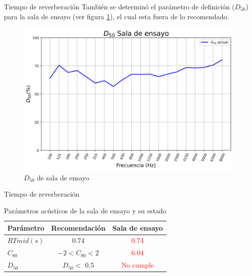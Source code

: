 \documentclass{sintefbeamer}
\begin{document}
\begin{frame}{Tiempo de reverberación}
    También se determinó el parámetro de definición ($D_{50}$) para la sala de ensayo (ver figura \ref{fig: D50 sala de ensayo}), el cual esta fuera de lo recomendado.
    \begin{figure}[H]
        \centering
        \includegraphics[scale=0.35]{images/D50_ensayo.png}
        \caption{$D_{50}$ de sala de ensayo}
        \label{fig: D50 sala de ensayo}
    \end{figure}
\end{frame}
\begin{frame}{Tiempo de reverberación}
    \begin{table}[H]
        \centering
        \begin{tabular}{|l|c|c|}
        \hline
        \textbf{Parámetro}& \textbf{Recomendación} & \textbf{Sala de ensayo}\\ \hline
        $RT{mid} (s)$&  0.74 & \textcolor{red}{0.74} \\ \hline
        $C_{80}$ & $-2<C_{80}<2$ & \textcolor{red}{6.04} \\\hline
        $D_{50}$ & $D_{50}<$ 0.5 & \textcolor{red}{No cumple} \\\hline
        \end{tabular}
        \caption{Parámetros acústicos de la sala de ensayo y su estado}
        \label{tab:prametros acusticos sala ensayo}
    \end{table}
\end{frame}
\end{document}
